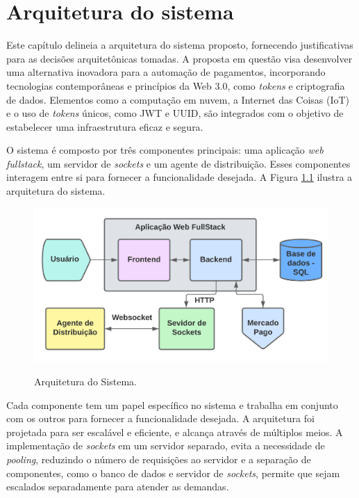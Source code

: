 \chapter{Arquitetura do sistema}\label{cap:arquitetura}
 
Este capítulo delineia a arquitetura do sistema proposto, fornecendo justificativas para as decisões arquitetônicas tomadas. A proposta em questão visa desenvolver uma alternativa inovadora para a automação de pagamentos, incorporando tecnologias contemporâneas e princípios da Web 3.0, como \textit{tokens} e criptografia de dados. Elementos como a computação em nuvem, a Internet das Coisas (\gls{IoT}) e o uso de \textit{tokens} únicos, como JWT e UUID, são integrados com o objetivo de estabelecer uma infraestrutura eficaz e segura.

O sistema é composto por três componentes principais: uma aplicação \textit{web fullstack}, um servidor de \textit{sockets} e um agente de distribuição. Esses componentes interagem entre si para fornecer a funcionalidade desejada. A Figura \ref{fig:system_architecture} ilustra a arquitetura do sistema.

\begin{figure}[h]
\centering
\caption{Arquitetura do Sistema.}
\includegraphics[width=1\textwidth]{figuras/Arquitetura.png}
\label{fig:system_architecture}
\end{figure}

Cada componente tem um papel específico no sistema e trabalha em conjunto com os outros para fornecer a funcionalidade desejada. A arquitetura foi projetada para ser escalável e eficiente, e alcança através de múltiplos meios. A implementação de \textit{sockets} em um servidor separado, evita a necessidade de \textit{pooling}, reduzindo o número de requisições ao servidor e a separação de componentes, como o banco de dados e servidor de \textit{sockets}, permite que sejam escalados separadamente para atender as demandas.

